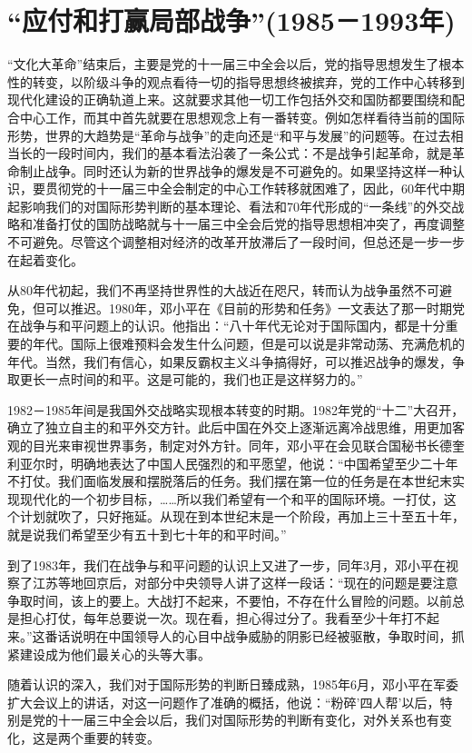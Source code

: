 \documentclass[UTF8, 12pt, a4paper]{ctexrep}
\begin{document}
\section{“应付和打赢局部战争”(1985－1993年)}

“文化大革命”结束后，主要是党的十一届三中全会以后，党的指导思想发生了根本性的转变，以阶级斗争的观点看待一切的指导思想终被摈弃，党的工作中心转移到现代化建设的正确轨道上来。这就要求其他一切工作包括外交和国防都要围绕和配合中心工作，而其中首先就要在思想观念上有一番转变。例如怎样看待当前的国际形势，世界的大趋势是“革命与战争”的走向还是“和平与发展”的问题等。在过去相当长的一段时间内，我们的基本看法沿袭了一条公式：不是战争引起革命，就是革命制止战争。同时还认为新的世界战争的爆发是不可避免的。如果坚持这样一种认识，要贯彻党的十一届三中全会制定的中心工作转移就困难了，因此，60年代中期起影响我们的对国际形势判断的基本理论、看法和70年代形成的“一条线”的外交战略和准备打仗的国防战略就与十一届三中全会后党的指导思想相冲突了，再度调整不可避免。尽管这个调整相对经济的改革开放滞后了一段时间，但总还是一步一步在起着变化。

从80年代初起，我们不再坚持世界性的大战近在咫尺，转而认为战争虽然不可避免，但可以推迟。1980年，邓小平在《目前的形势和任务》一文表达了那一时期党在战争与和平问题上的认识。他指出：“八十年代无论对于国际国内，都是十分重要的年代。国际上很难预料会发生什么问题，但是可以说是非常动荡、充满危机的年代。当然，我们有信心，如果反霸权主义斗争搞得好，可以推迟战争的爆发，争取更长一点时间的和平。这是可能的，我们也正是这样努力的。”

1982－1985年间是我国外交战略实现根本转变的时期。1982年党的“十二”大召开，确立了独立自主的和平外交方针。此后中国在外交上逐渐远离冷战思维，用更加客观的目光来审视世界事务，制定对外方针。同年，邓小平在会见联合国秘书长德奎利亚尔时，明确地表达了中国人民强烈的和平愿望，他说：“中国希望至少二十年不打仗。我们面临发展和摆脱落后的任务。我们摆在第一位的任务是在本世纪末实现现代化的一个初步目标，……所以我们希望有一个和平的国际环境。一打仗，这个计划就吹了，只好拖延。从现在到本世纪末是一个阶段，再加上三十至五十年，就是说我们希望至少有五十到七十年的和平时间。”

到了1983年，我们在战争与和平问题的认识上又进了一步，同年3月，邓小平在视察了江苏等地回京后，对部分中央领导人讲了这样一段话：“现在的问题是要注意争取时间，该上的要上。大战打不起来，不要怕，不存在什么冒险的问题。以前总是担心打仗，每年总要说一次。现在看，担心得过分了。我看至少十年打不起来。”这番话说明在中国领导人的心目中战争威胁的阴影已经被驱散，争取时间，抓紧建设成为他们最关心的头等大事。

随着认识的深入，我们对于国际形势的判断日臻成熟，1985年6月，邓小平在军委扩大会议上的讲话，对这一问题作了准确的概括，他说：“粉碎'四人帮'以后，特别是党的十一届三中全会以后，我们对国际形势的判断有变化，对外关系也有变化，这是两个重要的转变。
\end{document}
